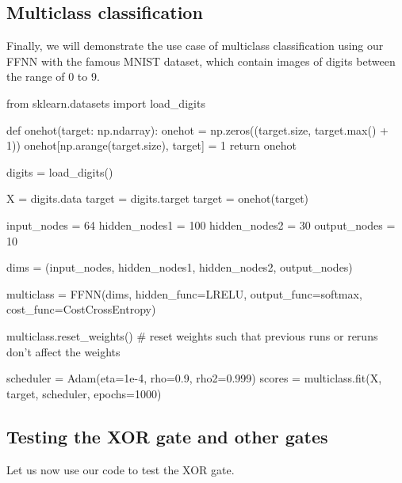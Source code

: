 \documentclass[%
oneside,                 %
final,                   %
10pt]{article}
\begin{document}
\epycod


\subsection{Multiclass classification}

Finally, we will demonstrate the use case of multiclass classification
using our FFNN with the famous MNIST dataset, which contain images of
digits between the range of 0 to 9.





























\bpycod
from sklearn.datasets import load_digits

def onehot(target: np.ndarray):
    onehot = np.zeros((target.size, target.max() + 1))
    onehot[np.arange(target.size), target] = 1
    return onehot

digits = load_digits()

X = digits.data
target = digits.target
target = onehot(target)

input_nodes = 64
hidden_nodes1 = 100
hidden_nodes2 = 30
output_nodes = 10

dims = (input_nodes, hidden_nodes1, hidden_nodes2, output_nodes)

multiclass = FFNN(dims, hidden_func=LRELU, output_func=softmax, cost_func=CostCrossEntropy)

multiclass.reset_weights() # reset weights such that previous runs or reruns don't affect the weights

scheduler = Adam(eta=1e-4, rho=0.9, rho2=0.999)
scores = multiclass.fit(X, target, scheduler, epochs=1000)


\epycod


\subsection{Testing the XOR gate and other gates}

Let us now use our code to test the XOR gate.
\end{document}

